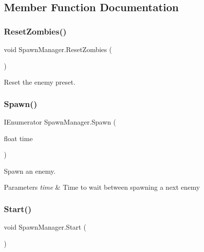 \subsection{Member Function Documentation}
\mbox{\label{class_spawn_manager_a6dad11bc457d16e663c8c4a4994f2182}} 
\subsubsection{\texorpdfstring{ResetZombies()}{ResetZombies()}}
{\footnotesize\ttfamily void Spawn\+Manager.\+Reset\+Zombies (\begin{DoxyParamCaption}{ }\end{DoxyParamCaption})}



Reset the enemy preset. 

\mbox{\label{class_spawn_manager_a782e3638027c192b98a70eda45bbf55a}} 
\subsubsection{\texorpdfstring{Spawn()}{Spawn()}}
{\footnotesize\ttfamily I\+Enumerator Spawn\+Manager.\+Spawn (\begin{DoxyParamCaption}\item[{float}]{time }\end{DoxyParamCaption})\hspace{0.3cm}{\ttfamily [private]}}



Spawn an enemy. 


\begin{DoxyParams}{Parameters}
{\em time} & Time to wait between spawning a next enemy \\
\hline
\end{DoxyParams}
\mbox{\label{class_spawn_manager_a6ff60868f646f56a7cbef6d0f1e272ff}} 
\subsubsection{\texorpdfstring{Start()}{Start()}}
{\footnotesize\ttfamily void Spawn\+Manager.\+Start (\begin{DoxyParamCaption}{ }\end{DoxyParamCaption})\hspace{0.3cm}{\ttfamily [private]}}



